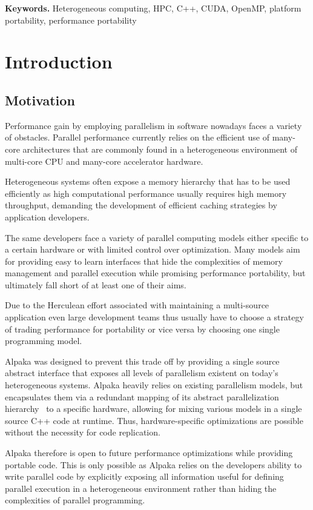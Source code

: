 \documentclass[10pt, twocolumn]{article}
\begin{document}
\smallskip
\noindent \textbf{Keywords.} Heterogeneous computing, HPC, C++, CUDA, OpenMP, platform portability, performance portability

\section{Introduction}

\subsection{Motivation}
Performance gain by employing parallelism in software nowadays faces a variety of obstacles.
Parallel performance currently relies on the efficient use of many-core architectures that are commonly found in a heterogeneous environment of multi-core CPU and many-core accelerator hardware.

Heterogeneous systems often expose a memory hierarchy that has to be used efficiently as high computational performance usually requires high memory throughput, demanding the development of efficient caching strategies by application developers.

The same developers face a variety of parallel computing models either specific to a certain hardware or with limited control over optimization.
Many models aim for providing easy to learn interfaces that hide the complexities of memory management and parallel execution while promising performance portability, but ultimately fall short of at least one of their aims.

Due to the Herculean effort associated with maintaining a multi-source application even large development teams thus usually have to choose a strategy of trading performance for portability or vice versa by choosing one single programming model.

Alpaka was designed to prevent this trade off by providing a single source abstract interface that exposes all levels of parallelism existent on today's heterogeneous  systems.
Alpaka heavily relies on existing parallelism models, but encapsulates them via a redundant mapping of its abstract parallelization hierarchy~\cite{rocki2014future} to a specific hardware, allowing for mixing various models in a single source C++ code at runtime. Thus, hardware-specific optimizations are possible without the necessity for code replication. 

Alpaka therefore is open to future performance optimizations while providing portable code.
This is only possible as Alpaka relies on the developers ability to write parallel code by explicitly exposing all information useful for defining parallel execution in a heterogeneous environment rather than hiding the complexities of parallel programming.
\end{document}
